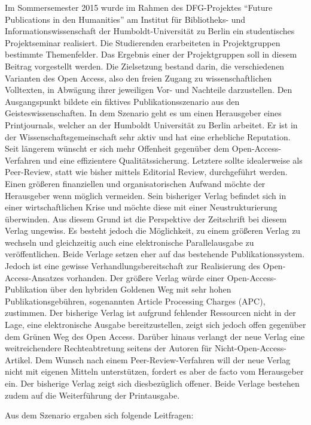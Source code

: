 \documentclass[a4paper,
fontsize=11pt,
oneside,
numbers=noperiodatend,
parskip=half-,
bibliography=totoc,
final
]{scrartcl}
\begin{document}
Im Sommersemester 2015 wurde im Rahmen des DFG-Projektes \enquote{Future
Publications in den Humanities} am Institut für Bibliotheks- und
Informationswissenschaft der Humboldt-Universität zu Berlin ein
studentisches Projektseminar realisiert. Die Studierenden erarbeiteten
in Projektgruppen bestimmte Themenfelder. Das Ergebnis einer der
Projektgruppen soll in diesem Beitrag vorgestellt werden. Die
Zielsetzung bestand darin, die verschiedenen Varianten des Open Access,
also den freien Zugang zu wissenschaftlichen Volltexten, in Abwägung
ihrer jeweiligen Vor- und Nachteile darzustellen. Den Ausgangspunkt
bildete ein fiktives Publikationsszenario aus den Geisteswissenschaften.
In dem Szenario geht es um einen Herausgeber eines Printjournals,
welcher an der Humboldt Universität zu Berlin arbeitet. Er ist in der
Wissenschaftsgemeinschaft sehr aktiv und hat eine erhebliche Reputation.
Seit längerem wünscht er sich mehr Offenheit gegenüber dem
Open-Access-Verfahren und eine effizientere Qualitätssicherung. Letztere
sollte idealerweise als Peer-Review, statt wie bisher mittels Editorial
Review, durchgeführt werden. Einen größeren finanziellen und
organisatorischen Aufwand möchte der Herausgeber wenn möglich vermeiden.
Sein bisheriger Verlag befindet sich in einer wirtschaftlichen Krise und
möchte diese mit einer Neustrukturierung überwinden. Aus diesem Grund
ist die Perspektive der Zeitschrift bei diesem Verlag ungewiss. Es
besteht jedoch die Möglichkeit, zu einem größeren Verlag zu wechseln und
gleichzeitig auch eine elektronische Parallelausgabe zu veröffentlichen.
Beide Verlage setzen eher auf das bestehende Publikationssystem. Jedoch
ist eine gewisse Verhandlungsbereitschaft zur Realisierung des
Open-Access-Ansatzes vorhanden. Der größere Verlag würde einer
Open-Access-Publikation über den hybriden Goldenen Weg mit sehr hohen
Publikationsgebühren, sogenannten Article Processing Charges (APC),
zustimmen. Der bisherige Verlag ist aufgrund fehlender Ressourcen nicht
in der Lage, eine elektronische Ausgabe bereitzustellen, zeigt sich
jedoch offen gegenüber dem Grünen Weg des Open Access. Darüber hinaus
verlangt der neue Verlag eine weitreichendere Rechteabtretung seitens
der Autoren für Nicht-Open-Access-Artikel. Dem Wunsch nach einem
Peer-Review-Verfahren will der neue Verlag nicht mit eigenen Mitteln
unterstützen, fordert es aber de facto vom Herausgeber ein. Der
bisherige Verlag zeigt sich diesbezüglich offener. Beide Verlage
bestehen zudem auf die Weiterführung der Printausgabe.

Aus dem Szenario ergaben sich folgende Leitfragen:
\end{document}
